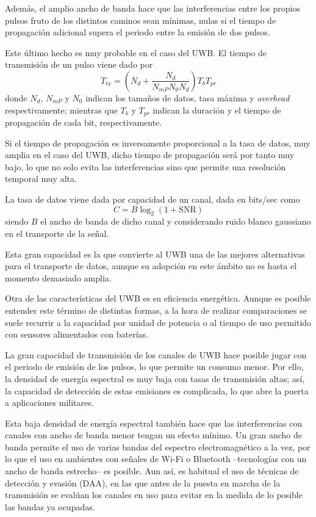 Además, el amplio ancho de banda hace que las interferencias entre los propios pulsos fruto de los distintos caminos sean mínimas, nulas si el tiempo de propagación adicional supera el periodo entre la emisión de dos pulsos.

Este último hecho es muy probable en el caso del UWB.
El tiempo de transmisión de un pulso viene dado por\cite{MAIN}
\begin{equation}
    T_{tx} = \left(N_d + \frac{N_d}{N_{mP}N_{0}N_d} \right) T_b T_{pr}
\end{equation}
donde $N_d$, $N_{mP}$ y $N_{0}$ indican los tamaños de datos, tasa máxima y \textit{overhead} respectivamente;
mientras que $T_b$ y $T_{pr}$ indican la duración y el tiempo de propagación de cada bit, respectivamente.

Si el tiempo de propagación es inversamente proporcional a la tasa de datos, muy amplia en el caso del UWB, dicho tiempo de propagación será por tanto muy bajo, lo que no solo evita las interferencias sino que permite una resolución temporal muy alta.

La tasa de datos viene dada por capacidad de un canal, dada en bits/sec como\cite{MAIN}
\begin{equation}
    C = B\log_2(1 + \text{SNR})
\end{equation}
siendo $B$ el ancho de banda de dicho canal y considerando ruido blanco gaussiano en el transporte de la señal.

Esta gran capacidad es la que convierte al UWB una de las mejores alternativas para el transporte de datos, aunque su adopción en este ámbito no es hasta el momento demasiado amplia.

Otra de las características del UWB es su eficiencia energética.
Aunque es posible entender este término de distintas formas, a la hora de realizar comparaciones se suele recurrir a la capacidad por unidad de potencia o al tiempo de uso permitido con sensores alimentados con baterías.

La gran capacidad de transmisión de los canales de UWB hace posible jugar con el periodo de emisión de los pulsos, lo que permite un consumo menor.
Por ello, la densidad de energía espectral es muy baja con tasas de transmisión altas; así, la capacidad de detección de estas emisiones es complicada, lo que abre la puerta a aplicaciones militares.

Esta baja densidad de energía espectral también hace que las interferencias con canales con ancho de banda menor tengan un efecto mínimo.
Un gran ancho de banda permite el uso de varias bandas del espectro electromagnético a la vez, por lo que el uso en ambientes con señales de Wi-Fi o Bluetooth --tecnologías con un ancho de banda estrecho-- es posible.
Aun así, es habitual el uso de técnicas de detección y evasión (DAA), en las que antes de la puesta en marcha de la transmisión se evalúan los canales en uso para evitar en la medida de lo posible las bandas ya ocupadas.

